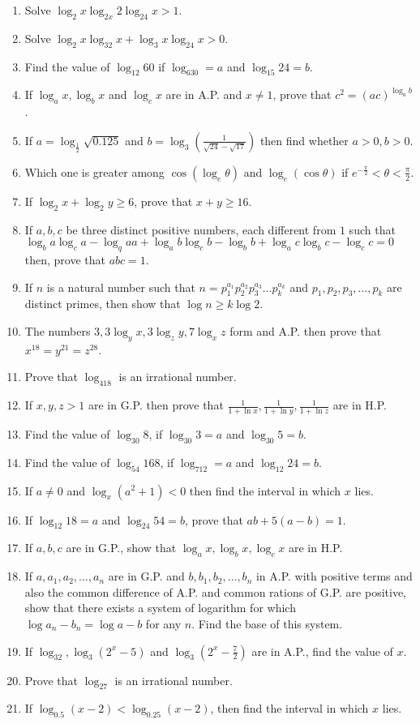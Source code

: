 \begin{enumerate}[resume]
\item Solve $\log_2x\log_{2x}2\log_24x > 1$.
\item Solve $\log_2x\log_32x + \log_3x\log_24x > 0$.
\item Find the value of $\log_{12}60$ if $\log_630 = a$ and $\log_{15}24 = b$.
\item If $\log_ax, \log_bx$ and $\log_cx$ are in A.P. and $x\neq 1$, prove that $c^2 = (ac)^{\log_ab}$.
\item If $a = \log_{\tfrac{1}{2}}\sqrt{0.125}$ and $b = \log_3\left(\frac{1}{\sqrt{24} - \sqrt{17}}\right)$ then find whether $a >0,
  b> 0$.
\item Which one is greater among $\cos(\log_e\theta)$ and $\log_e(\cos\theta)$ if $e^{-\tfrac{\pi}{2}} < \theta < \frac{\pi}{2}$.
\item If $\log_2x + \log_2y \geq 6$, prove that $x + y\geq 16$.
\item If $a,b,c$ be three distinct positive numbers, each different from $1$ such that $\log_ba\log_ca - \log_qaa + \log_ab\log_cb
  - \log_bb + \log_ac\log_bc - \log_cc = 0$ then, prove that $abc = 1$.
\item If $n$ is a natural number such that $n = p_1^{a_1}p_2^{a_2}p_3^{a_3}\ldots p_k^{a_k}$ and $p_1, p_2, p_3, \ldots, p_k$ are
  distinct primes, then show that $\log n\geq k\log 2$.
\item The numbers $3, 3\log_yx, 3\log_zy, 7\log_xz$ form and A.P. then prove that $x^{18} = y^{21} = z^{28}$.
\item Prove that $\log_418$ is an irrational number.
\item If $x, y, z> 1$ are in G.P. then prove that $\frac{1}{1+ \ln x}, \frac{1}{1 + \ln y}, \frac{1}{1 + \ln z}$ are in H.P.
\item Find the value of $\log_{30}8$, if $\log_{30}3 = a$ and $\log_{30}5 = b$.
\item Find the value of $\log_{54}168$, if $\log_712 = a$ and $\log_{12}24 = b$.
\item If $a\neq 0$ and $\log_x(a^2 + 1) < 0$ then find the interval in which $x$ lies.
\item If $\log_{12}18 = a$ and $\log_{24}54=b$, prove that $ab + 5(a - b) = 1$.
\item If $a,b,c$ are in G.P., show that $\log_ax, \log_bx, \log_cx$ are in H.P.
\item If $a, a_1, a_2, \ldots, a_n$ are in G.P. and $b, b_1, b_2, \ldots, b_n$ in A.P. with positive terms and also the common
  difference of A.P. and common rations of G.P. are positive, show that there exists a system of logarithm for which $\log a_n -
  b_n = \log a - b$ for any $n$. Find the base of this system.
\item If $\log_32, \log_3(2^x - 5)$ and $\log_3\left(2^x - \frac{7}{2}\right)$ are in A.P., find the value of $x$.
\item Prove that $\log_27$ is an irrational number.
\item If $\log_{0.5}(x - 2) < \log_{0.25}(x - 2)$, then find the interval in which $x$ lies.
\end{enumerate}

